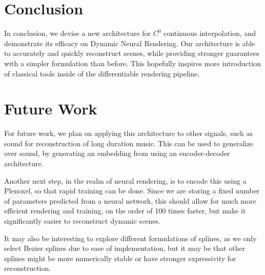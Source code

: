 \section{Conclusion}

In conclusion, we devise a new architecture for $C^0$ continuous interpolation, and demonstrate
its efficacy on Dynamic Neural Rendering. Our architecture is able to accurately and quickly
reconstruct scenes, while providing stronger guarantees with a simpler formulation than before.
This hopefully inspires more introduction of classical tools inside of the differentiable
rendering pipeline.

\section{Future Work}

For future work, we plan on applying this architecture to other signals, such as sound for
reconstruction of long duration music. This can be used to generalize over sound, by generating
an embedding from using an encoder-decoder architecture.

Another next step, in the realm of neural rendering, is to encode this using a Plenoxel, so that
rapid training can be done. Since we are storing a fixed number of parameters predicted from a
neural network, this should allow for much more efficient rendering and training, on the order
of 100 times faster, but make it significantly easier to reconstruct dynamic scenes.

It may also be interesting to explore different formulations of splines, as we only select
Bezier splines due to ease of implementation, but it may be that other splines might be more
numerically stable or have stronger expressivity for reconstruction.
